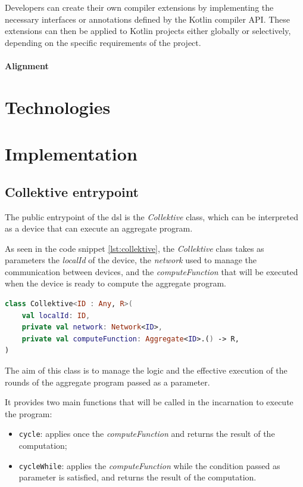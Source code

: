 Developers can create their own compiler extensions by implementing the necessary interfaces or annotations defined by
the Kotlin compiler API.
These extensions can then be applied to Kotlin projects either globally or selectively, depending on the specific
requirements of the project.

\paragraph{Alignment}

\section{Technologies}
\label{sec:technologies}

\section{Implementation}
\label{sec:implementation}


\subsection{Collektive entrypoint}
\label{subsec:collektive-entrypoint}
The public entrypoint of the \ac{dsl} is the \emph{Collektive} class, which can be interpreted as a device that can
execute an aggregate program.

As seen in the code snippet \ref{lst:collektive}, the \emph{Collektive} class takes as parameters the \emph{localId} of the device,
the \emph{network} used to manage the communication between devices, and the \emph{computeFunction} that will be executed
when the device is ready to compute the aggregate program.

\begin{lstlisting}[language=kt,label={lst:collektive}, caption={The signature of the \texttt{Collektive} class.}]
class Collektive<ID : Any, R>(
    val localId: ID,
    private val network: Network<ID>,
    private val computeFunction: Aggregate<ID>.() -> R,
)
\end{lstlisting}

The aim of this class is to manage the logic and the effective execution of the rounds of the aggregate program passed as a parameter.

It provides two main functions that will be called in the incarnation to execute the program:
\begin{itemize}
    \item \texttt{cycle}: applies once the \emph{computeFunction} and returns the result of the computation;
    \item \texttt{cycleWhile}: applies the \emph{computeFunction} while the condition passed as parameter is satisfied,
        and returns the result of the computation.
\end{itemize}

